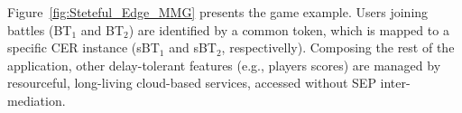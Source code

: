 


Figure~\ref{fig:Steteful_Edge_MMG} presents the game example. Users joining battles (BT$_1$ and BT$_2$) are identified by a common token, which is mapped to a specific CER instance (sBT$_1$ and sBT$_2$, respectivelly).
Composing the rest of the application, other delay-tolerant features (e.g., players scores) are managed by resourceful, long-living cloud-based services, accessed without SEP inter-mediation.  %

